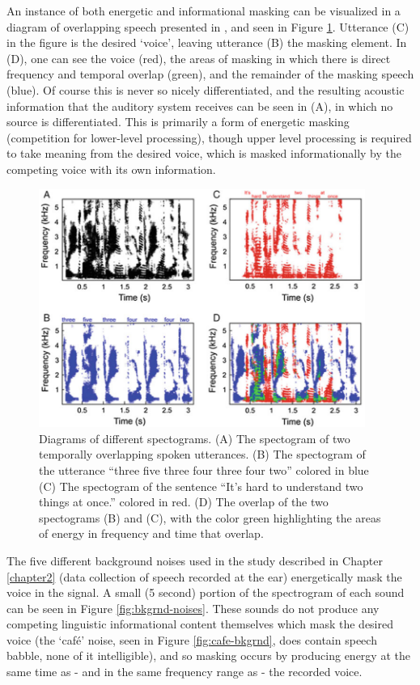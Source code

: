 An instance of both energetic and informational masking can be visualized in a diagram of overlapping speech presented in \cite{middlebrooks:17}, and seen in Figure \ref{fig:sos-masked-spctgrms}. Utterance (C) in the figure is the desired `voice', leaving utterance (B) the masking element.  In (D), one can see the voice (red), the areas of masking in which there is direct frequency and temporal overlap (green), and the remainder of the masking speech (blue). Of course this is never so nicely differentiated, and the resulting acoustic information that the auditory system receives can be seen in (A), in which no source is differentiated.  This is primarily a form of energetic masking (competition for lower-level processing), though upper level processing is required to take meaning from the desired voice, which is masked informationally by the competing voice with its own information.
%
\begin{figure}[h!]
\centering
  \includegraphics[width=0.95\textwidth]{figure/speech-on-speech_masked_spectrograms.png}
  \caption{Diagrams of different spectograms. (A) The spectogram of two temporally overlapping spoken utterances. (B) The spectogram of the utterance ``three five three four three four two'' colored in blue (C) The spectogram of the sentence ``It's hard to understand two things at once.'' colored in red. (D) The overlap of the two spectograms (B) and (C), with the color green highlighting the areas of energy in frequency and time that overlap. }
  \label{fig:sos-masked-spctgrms}
\end{figure}
%


The five different background noises used in the study described in Chapter \ref{chapter2} (data collection of speech recorded at the ear) energetically mask the voice in the signal.  A small (5 second) portion of the spectrogram of each sound can be seen in Figure \ref{fig:bkgrnd-noises}.  These sounds do not produce any competing linguistic informational content themselves which mask the desired voice (the `caf\'{e}' noise, seen in Figure \ref{fig:cafe-bkgrnd}, does contain speech babble, none of it intelligible), and so masking occurs by producing energy at the same time as - and in the same frequency range as - the recorded voice.


